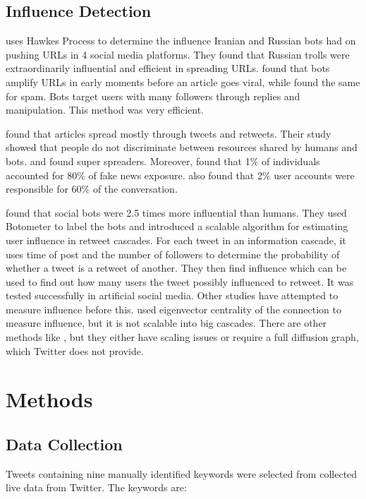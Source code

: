 \documentclass[letterpaper]{article}
\begin{document}
\subsection{Influence Detection}
\cite{zannettou2019let} uses Hawkes Process to determine the influence Iranian and Russian bots had on pushing URLs
 in 4 social media platforms. They found that Russian trolls were extraordinarily 
influential and efficient in spreading URLs. \cite{shao2018spread} found that bots amplify URLs in early moments 
before an article goes viral, while \cite{ferrara2018measuring} 
found the same for spam. Bots target users with many followers through replies and manipulation. This method was
 very efficient. \par


\cite{shao2018spread} found that articles spread 
mostly through tweets and retweets. Their study showed that people do not discriminate between resources 
shared by humans and bots. \cite{shao2018spread} and \cite{grinberg2019fake} found super spreaders. 
Moreover, \cite{grinberg2019fake} found that 1\% of individuals accounted for 80\% of fake news exposure. 
\cite{varol2017early} also found that 2\% user accounts were responsible for 60\% of the conversation. \par

\cite{rizoiu2018debatenight} found that social bots were 2.5 times more influential than humans. They used 
Botometer to label the bots and introduced a 
scalable algorithm for estimating user influence in retweet cascades. 
For each tweet in an information cascade, it uses time of post and the number of followers to determine the 
probability of whether a tweet is a retweet of another. They then find influence which can be used 
to find out how many users the tweet possibly influenced to retweet. It was tested successfully in 
artificial social media. Other studies have attempted to measure influence before this. 
\cite{weng2010twitterrank} used eigenvector centrality of the connection to measure influence, but it is 
not scalable into big cascades. There are other methods like 
\cite{rodriguez2011uncovering,cho2013latent,linderman2014discovering}, but they either have scaling issues or 
require a full diffusion graph, which Twitter does not provide.

\section{Methods}
\label{sec:method}
\subsection{Data Collection}
Tweets containing nine manually identified keywords were selected from collected live data from Twitter. The 
keywords are:
\end{document}

